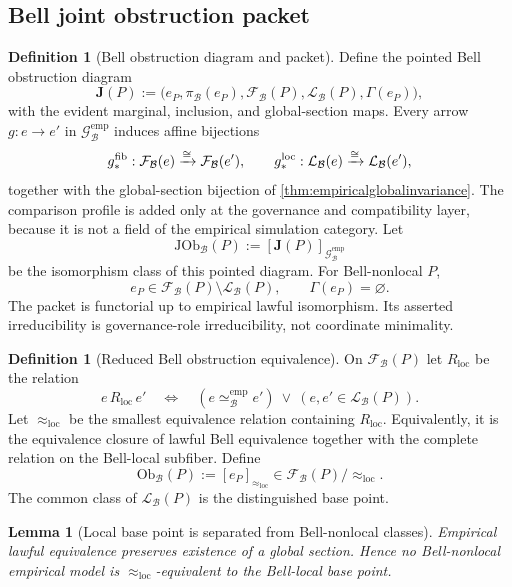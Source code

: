 \documentclass[11pt]{article}
\newtheorem{lemma}[theorem]{Lemma}
\theoremstyle{definition}
\newtheorem{definition}[theorem]{Definition}
\newcommand{\Bell}{\mathcal{B}}
\newcommand{\EmpLaw}{\mathscr{G}^{\mathrm{emp}}_{\Bell}}
\newcommand{\EmpEq}{\simeq^{\mathrm{emp}}_{\Bell}}
\newcommand{\GlobalSec}{\Gamma}
\newcommand{\Marg}{\pi_{\Bell}}
\newcommand{\BellFiber}{\mathcal F_{\Bell}}
\newcommand{\BellLocal}{\mathcal L_{\Bell}}
\newcommand{\JOb}{\mathrm{JOb}_{\Bell}}
\newcommand{\ObBell}{\mathrm{Ob}_{\Bell}}
\begin{document}
\subsection{Bell joint obstruction packet}

\begin{definition}[Bell obstruction diagram and packet]\label{def:jointinvariant}
Define the pointed Bell obstruction diagram
\[
\mathbf J(P):=\bigl(e_P,\Marg(e_P),\BellFiber(P),\BellLocal(P),
\GlobalSec(e_P)\bigr),
\]
with the evident marginal, inclusion, and global-section maps. Every arrow $g:e\to e'$ in $\EmpLaw$ induces affine bijections
\[
g_*^{\rm fib}:\BellFiber(e)\xrightarrow{\cong}\BellFiber(e'),
\qquad
g_*^{\rm loc}:\BellLocal(e)\xrightarrow{\cong}\BellLocal(e'),
\]
together with the global-section bijection of \cref{thm:empiricalglobalinvariance}. The comparison profile is added only at the governance and compatibility layer, because it is not a field of the empirical simulation category. Let
\[
\JOb(P):=[\mathbf J(P)]_{\EmpLaw}
\]
be the isomorphism class of this pointed diagram. For Bell-nonlocal $P$,
\[
e_P\in\BellFiber(P)\setminus\BellLocal(P),\qquad\GlobalSec(e_P)=\varnothing.
\]
The packet is functorial up to empirical lawful isomorphism. Its asserted irreducibility is governance-role irreducibility, not coordinate minimality.
\end{definition}

\begin{definition}[Reduced Bell obstruction equivalence]\label{def:reducedobstruction}
On $\BellFiber(P)$ let $R_{\mathrm{loc}}$ be the relation
\[
e\,R_{\mathrm{loc}}\,e'
\quad\Longleftrightarrow\quad
(e\EmpEq e')\ \lor\ (e,e'\in\BellLocal(P)).
\]
Let $\approx_{\mathrm{loc}}$ be the smallest equivalence relation containing $R_{\mathrm{loc}}$. Equivalently, it is the equivalence closure of lawful Bell equivalence together with the complete relation on the Bell-local subfiber. Define
\[
\ObBell(P):=[e_P]_{\approx_{\mathrm{loc}}}\in\BellFiber(P)/\!\approx_{\mathrm{loc}}.
\]
The common class of $\BellLocal(P)$ is the distinguished base point.
\end{definition}

\begin{lemma}[Local base point is separated from Bell-nonlocal classes]\label{lem:obstructionseparation}
Empirical lawful equivalence preserves existence of a global section. Hence no Bell-nonlocal empirical model is $\approx_{\mathrm{loc}}$-equivalent to the Bell-local base point.
\end{lemma}
\end{document}
